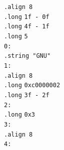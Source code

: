 \documentclass[10pt,t]{beamer}
\begin{document}
\begin{frame}
  \hphantom{aaaaa} \texttt{.align 8} \\
  \hphantom{aaaaa} \texttt{.long} \hphantom{aaa} \texttt{1f - 0f} \\
  \hphantom{aaaaa} \texttt{.long} \hphantom{aaa} \texttt{4f - 1f} \\
  \hphantom{aaaaa} \texttt{.long} \hphantom{aaa} \texttt{5} \\
  \texttt{0:} \\
  \hphantom{aaaaa} \texttt{.string "GNU"} \\
  \texttt{1:} \\
  \hphantom{aaaaa} \texttt{.align 8} \\
  \hphantom{aaaaa} \texttt{.long} \hphantom{aaa} \texttt{0xc0000002} \\
  \hphantom{aaaaa} \texttt{.long} \hphantom{aaa} \texttt{3f - 2f} \\
  \texttt{2:} \\
  \hphantom{aaaaa} \texttt{.long} \hphantom{aaa} \texttt{0x3} \\
  \texttt{3:} \\
  \hphantom{aaaaa} \texttt{.align 8} \\
  \texttt{4:}

\end{frame}
\end{document}
